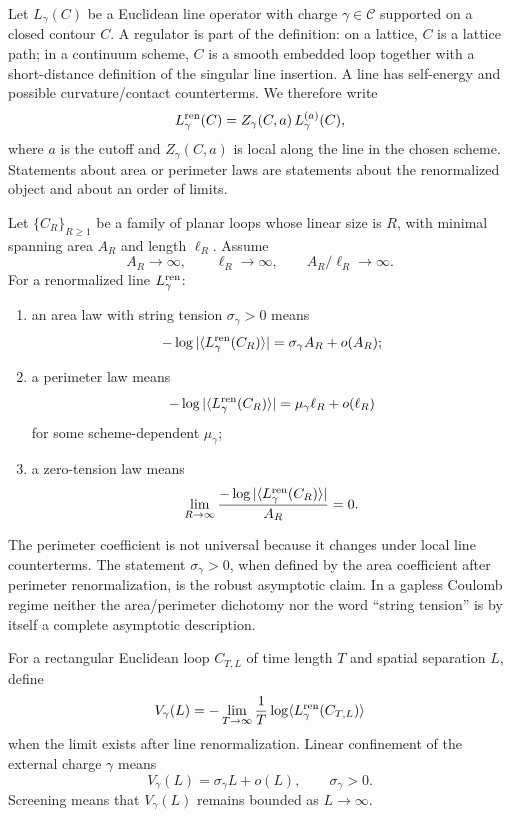 Let \(L_\gamma(C)\) be a Euclidean line operator with charge
\(\gamma\in\mathcal C\) supported on a closed contour \(C\).  A regulator is
part of the definition: on a lattice, \(C\) is a lattice path; in a continuum
scheme, \(C\) is a smooth embedded loop together with a short-distance
definition of the singular line insertion.  A line has self-energy and
possible curvature/contact counterterms.  We therefore write
\[
  L_\gamma^{\rm ren}(C)
  =
  Z_\gamma(C,a)\,L_\gamma^{(a)}(C),
\]
where \(a\) is the cutoff and \(Z_\gamma(C,a)\) is local along the line in the
chosen scheme.  Statements about area or perimeter laws are statements about
the renormalized object and about an order of limits.

\begin{definition}
\label{def:line-area-perimeter-laws}
Let \(\{C_R\}_{R\ge1}\) be a family of planar loops whose linear size is
\(R\), with minimal spanning area \(A_R\) and length \(\ell_R\).  Assume
\[
  A_R\to\infty,\qquad \ell_R\to\infty,\qquad A_R/\ell_R\to\infty .
\]
For a renormalized line \(L_\gamma^{\rm ren}\):
\begin{enumerate}
  \item an area law with string tension \(\sigma_\gamma>0\) means
  \[
    -\log |\langle L_\gamma^{\rm ren}(C_R)\rangle|
    =
    \sigma_\gamma A_R+o(A_R);
  \]
  \item a perimeter law means
  \[
    -\log |\langle L_\gamma^{\rm ren}(C_R)\rangle|
    =
    \mu_\gamma \ell_R+o(\ell_R)
  \]
  for some scheme-dependent \(\mu_\gamma\);
  \item a zero-tension law means
  \[
    \lim_{R\to\infty}
    \frac{-\log |\langle L_\gamma^{\rm ren}(C_R)\rangle|}{A_R}=0.
  \]
\end{enumerate}
\end{definition}

The perimeter coefficient is not universal because it changes under local
line counterterms.  The statement \(\sigma_\gamma>0\), when defined by the
area coefficient after perimeter renormalization, is the robust asymptotic
claim.  In a gapless Coulomb regime neither the area/perimeter dichotomy nor
the word ``string tension'' is by itself a complete asymptotic description.

\begin{definition}
\label{def:static-potential-rectangular-lines}
For a rectangular Euclidean loop \(C_{T,L}\) of time length \(T\) and spatial
separation \(L\), define
\[
  V_\gamma(L)
  =
  -\lim_{T\to\infty}\frac{1}{T}
  \log \langle L_\gamma^{\rm ren}(C_{T,L})\rangle
\]
when the limit exists after line renormalization.  Linear confinement of the
external charge \(\gamma\) means
\[
  V_\gamma(L)=\sigma_\gamma L+o(L),
  \qquad
  \sigma_\gamma>0 .
\]
Screening means that \(V_\gamma(L)\) remains bounded as \(L\to\infty\).
\end{definition}

